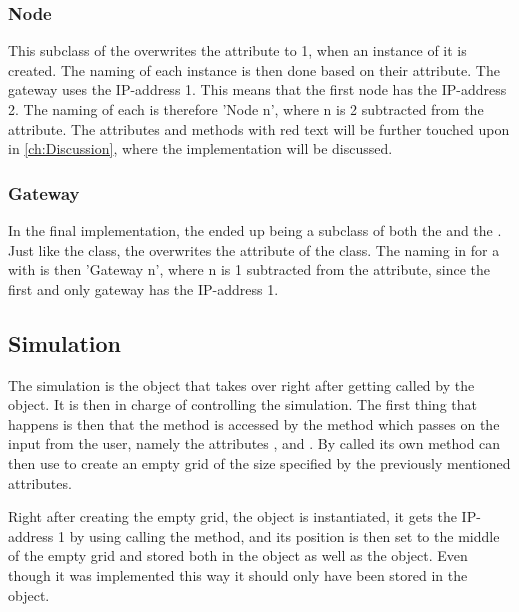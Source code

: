 \subsubsection{Node}\label{sec:Class_diagram_Node}
This subclass of the  overwrites the  attribute to 1, when an instance of it is created. The naming of each  instance is then done based on their  attribute. The gateway uses the IP-address 1. This means that the first node has the IP-address 2. The naming of each  is therefore 'Node n', where n is 2 subtracted from the  attribute. The attributes and methods with red text will be further touched upon in \autoref{ch:Discussion}, where the implementation will be discussed.

\subsubsection{Gateway}\label{sec:Class_diagram_Gateway}
In the final implementation, the  ended up being a subclass of both the  and the . Just like the  class, the  overwrites the  attribute of the  class. The naming in  for a  with  is then 'Gateway n', where n is 1 subtracted from the  attribute, since the first and only gateway has the IP-address 1.

\subsection{Simulation}
The simulation is the object that takes over right after getting called by the  object. It is then in charge of controlling the simulation. The first thing that happens is then that the  method is accessed by the  method which passes on the input from the user, namely the attributes , and . By called its own method  can then use  to create an empty grid of the size specified by the previously mentioned attributes.\bigbreak

\noindent Right after creating the empty grid, the  object is instantiated, it gets the IP-address 1 by using calling the  method, and its position is then set to the middle of the empty grid and stored both in the  object as well as the  object. Even though it was implemented this way it should only have been stored in the  object.





























